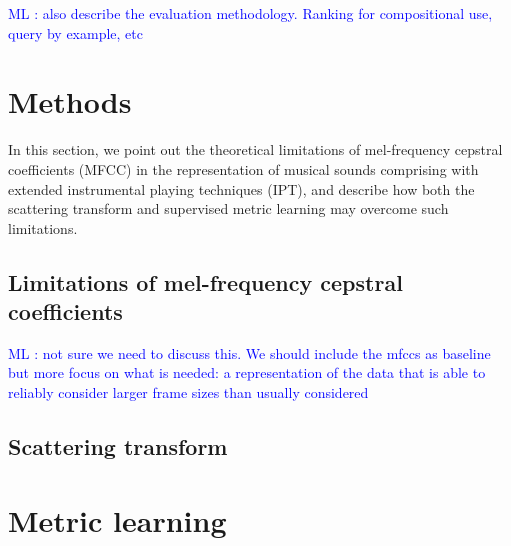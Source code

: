 \documentclass{article}
\newcommand{\ml}[1]{\textcolor{blue}{ML : #1}}
\begin{document}





\ml{also describe the evaluation methodology. Ranking for compositional use, query by example, etc}

\section{Methods}
In this section, we point out the theoretical limitations of mel-frequency cepstral coefficients (MFCC) in the representation of musical sounds comprising with extended instrumental playing techniques (IPT), and describe how both the scattering transform and supervised metric learning may overcome such limitations.

\subsection{Limitations of mel-frequency cepstral coefficients}

\ml{not sure we need to discuss this. We should include the mfccs as baseline but more focus on what is needed: a representation of the data that is able to reliably consider larger frame sizes than usually considered}

\subsection{Scattering transform} %
\cite{anden2012dafx}

\section{Metric learning} %
\end{document}
